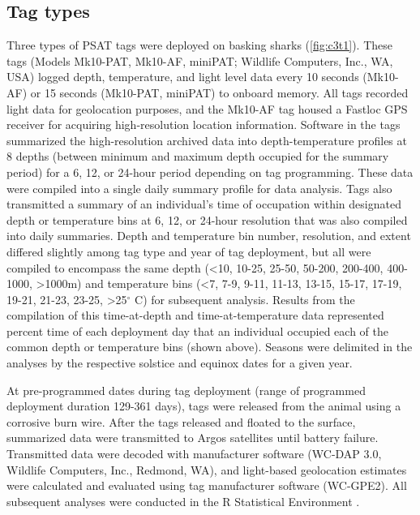 \subsection{Tag types}
Three types of PSAT tags were deployed on basking sharks (\cref{fig:c3t1}). These tags (Models Mk10-PAT, Mk10-AF, miniPAT; Wildlife Computers, Inc., WA, USA) logged depth, temperature, and light level data every 10 seconds (Mk10-AF) or 15 seconds (Mk10-PAT, miniPAT) to onboard memory. All tags recorded light data for geolocation purposes, and the Mk10-AF tag housed a Fastloc GPS receiver for acquiring high-resolution location information. Software in the tags summarized the high-resolution archived data into depth-temperature profiles at 8 depths (between minimum and maximum depth occupied for the summary period) for a 6, 12, or 24-hour period depending on tag programming. These data were compiled into a single daily summary profile for data analysis. Tags also transmitted a summary of an individual’s time of occupation within designated depth or temperature bins at 6, 12, or 24-hour resolution that was also compiled into daily summaries. Depth and temperature bin number, resolution, and extent differed slightly among tag type and year of tag deployment, but all were compiled to encompass the same depth (<10, 10-25, 25-50, 50-200, 200-400, 400-1000, >1000m) and temperature bins (<7, 7-9, 9-11, 11-13, 13-15, 15-17, 17-19, 19-21, 21-23, 23-25, >25$^{\circ}$ C) for subsequent analysis. Results from the compilation of this time-at-depth and time-at-temperature data represented percent time of each deployment day that an individual occupied each of the common depth or temperature bins (shown above). Seasons were delimited in the analyses by the respective solstice and equinox dates for a given year.

At pre-programmed dates during tag deployment (range of programmed deployment duration 129-361 days), tags were released from the animal using a corrosive burn wire. After the tags released and floated to the surface, summarized data were transmitted to Argos satellites until battery failure. Transmitted data were decoded with manufacturer software (WC-DAP 3.0, Wildlife Computers, Inc., Redmond, WA), and light-based geolocation estimates were calculated and evaluated using tag manufacturer software (WC-GPE2). All subsequent analyses were conducted in the R Statistical Environment \citep{RDevelopmentCoreTeam2015}. 

